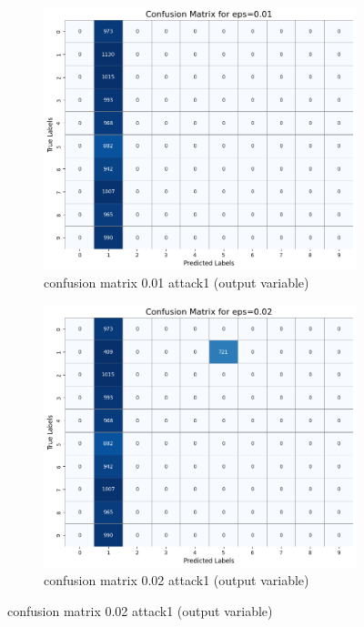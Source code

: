 \documentclass[11pt,onside]{article}
\begin{document}
\begin{figure}[h]
  \centering
  \begin{subfigure}[b]{0.49\textwidth}
    \centering
    \includegraphics[width=\textwidth]{V2_images/target_confusion_matrix_eps_0.01_attack_1.png}
    \caption{confusion matrix 0.01 attack1 (output variable)}
    \label{fig:image1}
  \end{subfigure}
  \hfill
  \begin{subfigure}[b]{0.49\textwidth}
    \centering
    \includegraphics[width=\textwidth]{V2_images/target_confusion_matrix_eps_0.02_attack_1.png}
    \caption{confusion matrix 0.02 attack1 (output variable)}
    \label{fig:image2}
  \end{subfigure}
  
  \label{fig:images}
\end{figure}
\end{document}
